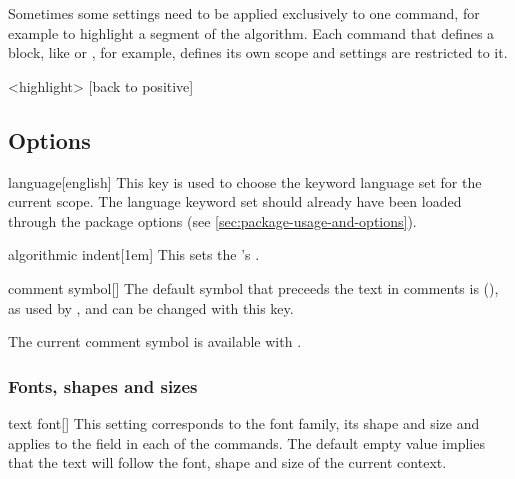 \documentclass[a4paper, 11pt]{article}
\begin{document}
Sometimes some settings need to be applied exclusively to one command, for example to highlight a segment of the algorithm. Each command that defines a block, like  or , for example, defines its own scope and settings are restricted to it.

\begin{tcblisting}{}
    \begin{algorithmic}
        <highlight>
            [back to positive]
        \EndIf
    \end{algorithmic}
\end{tcblisting}

\subsection{Options}

\begin{option}{language}{}[english]
    This key is used to choose the keyword language set for the current scope. The language keyword set should already have been loaded through the package options (see \cref{sec:package-usage-and-options}).
\end{option}

\begin{option}{algorithmic indent}{}[1em]
    This sets the 's .
\end{option}

\begin{option}{comment symbol}{}[]
    The default symbol that preceeds the text in comments is  (\CommentSymbol), as used by , and can be changed with this key.

    The current comment symbol is available with .
\end{option}

\subsubsection{Fonts, shapes and sizes}

\begin{option}{text font}{}[\Empty]
    This setting corresponds to the font family, its shape and size and applies to the  field in each of the commands. The default empty value implies that the text will follow the font, shape and size of the current context.
\end{option}
\end{document}
